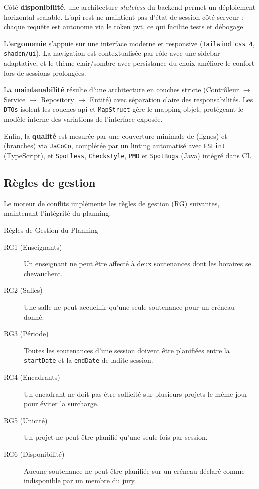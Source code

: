 Côté \textbf{disponibilité}, une architecture \textit{stateless} du backend permet un déploiement horizontal scalable. L'\acrshort{api} \acrshort{rest} ne maintient pas d'état de session côté serveur : chaque requête est autonome via le token \acrshort{jwt}, ce qui facilite tests et débogage.

L'\textbf{ergonomie} s'appuie sur une interface moderne et responsive (\texttt{Tailwind \acrshort{css} 4}, \texttt{shadcn/ui}). La navigation est contextualisée par rôle avec une sidebar adaptative, et le thème clair/sombre avec persistance du choix améliore le confort lors de sessions prolongées.

La \textbf{maintenabilité} résulte d'une architecture en couches stricte (Contrôleur $\rightarrow$ Service $\rightarrow$ Repository $\rightarrow$ Entité) avec séparation claire des responsabilités. Les \texttt{DTOs} isolent les couches \acrshort{api} et \texttt{MapStruct} gère le mapping objet, protégeant le modèle interne des variations de l'interface exposée.

Enfin, la \textbf{qualité} est mesurée par une couverture minimale de  (lignes) et  (branches) via \texttt{JaCoCo}, complétée par un linting automatisé avec \texttt{ESLint} (TypeScript), et \texttt{Spotless}, \texttt{Checkstyle}, \texttt{PMD} et \texttt{SpotBugs} (Java) intégré dans CI.

\subsection{Règles de gestion}
\label{ch3:regles_gestion}

Le moteur de conflits implémente les règles de gestion (RG) suivantes, maintenant l'intégrité du planning.

\begin{projectbox}{Règles de Gestion du Planning}
    \begin{description}
        \item[RG1 (Enseignants)] Un enseignant ne peut être affecté à deux soutenances dont les horaires se chevauchent.
        \item[RG2 (Salles)] Une salle ne peut accueillir qu'une seule soutenance pour un créneau donné.
        \item[RG3 (Période)] Toutes les soutenances d'une session doivent être planifiées entre la \texttt{startDate} et la \texttt{endDate} de ladite session.
        \item[RG4 (Encadrants)] Un encadrant ne doit pas être sollicité sur plusieurs projets le même jour pour éviter la surcharge.
        \item[RG5 (Unicité)] Un projet ne peut être planifié qu'une seule fois par session.
        \item[RG6 (Disponibilité)] Aucune soutenance ne peut être planifiée sur un créneau déclaré comme indisponible par un membre du jury.
    \end{description}
\end{projectbox}

